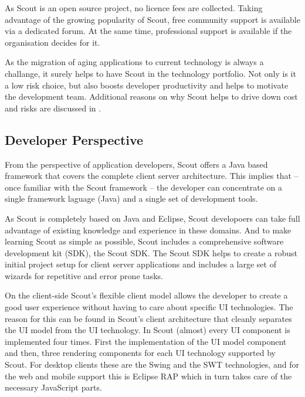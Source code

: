 \documentclass[a4paper,10pt,twoside]{book}
\begin{document}
As Scout is an open source project, no licence fees are collected. 
Taking advantage of the growing popularity of Scout, free community support is available via a dedicated forum. 
At the same time, professional support is available if the organisation decides for it.

As the migration of aging applications to current technology is always a challange, it surely helps to have Scout in the technology portfolio. 
Not only is it a low risk choice, but also boosts developer productivity and helps to motivate the development team. 
Additional reasons on why Scout helps to drive down cost and risks are discussed in .

\subsection{Developer Perspective}

From the perspective of application developers, Scout offers a Java based framework that covers the complete client server architecture. 
This implies that -- once familiar with the Scout framework -- the developer can concentrate on a single framework laguage (Java) and a single set of development tools. 

As Scout is completely based on Java and Eclipse, Scout developoers can take full advantage of existing knowledge and experience in these domains. 
And to make learning Scout as simple as possible, Scout includes a comprehensive software development kit (SDK), the Scout SDK.
The Scout SDK helps to create a robust initial project setup for client server applications and includes a large set of wizards for repetitive and error prone tasks.

On the client-side Scout's flexible client model allows the developer to create a good user experience without having to care about specific UI technologies. 
The reason for this can be found in Scout's client architecture that cleanly separates the UI model from the UI technology.
In Scout (almost) every UI component is implemented four times. 
First the implementation of the UI model component and then, three rendering components for each UI technology supported by Scout. 
For desktop clients these are the Swing and the SWT technologies, and for the web and mobile support this is Eclipse RAP which in turn takes care of the necessary JavaScript parts.  
\end{document}
